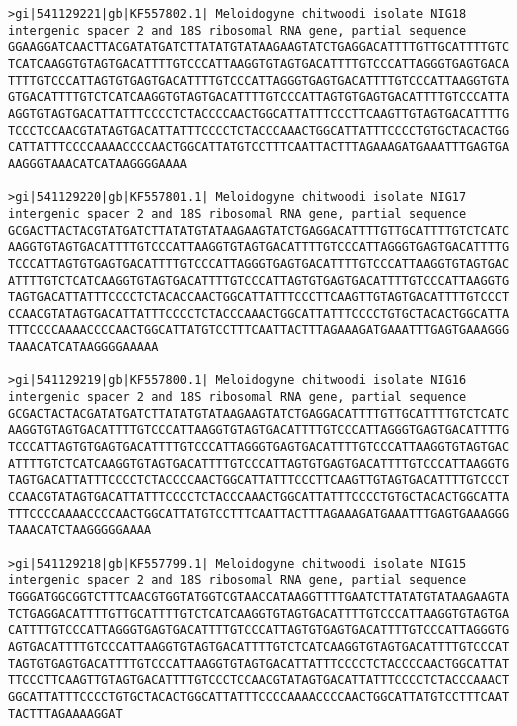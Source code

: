 \documentclass[11pt]{article}
\begin{document}
\begin{Verbatim}[commandchars=\\\{\}]
>gi|541129221|gb|KF557802.1| Meloidogyne chitwoodi isolate NIG18 intergenic spacer 2 and 18S ribosomal RNA gene, partial sequence
GGAAGGATCAACTTACGATATGATCTTATATGTATAAGAAGTATCTGAGGACATTTTGTTGCATTTTGTC
TCATCAAGGTGTAGTGACATTTTGTCCCATTAAGGTGTAGTGACATTTTGTCCCATTAGGGTGAGTGACA
TTTTGTCCCATTAGTGTGAGTGACATTTTGTCCCATTAGGGTGAGTGACATTTTGTCCCATTAAGGTGTA
GTGACATTTTGTCTCATCAAGGTGTAGTGACATTTTGTCCCATTAGTGTGAGTGACATTTTGTCCCATTA
AGGTGTAGTGACATTATTTCCCCTCTACCCCAACTGGCATTATTTCCCTTCAAGTTGTAGTGACATTTTG
TCCCTCCAACGTATAGTGACATTATTTCCCCTCTACCCAAACTGGCATTATTTCCCCTGTGCTACACTGG
CATTATTTCCCCAAAACCCCAACTGGCATTATGTCCTTTCAATTACTTTAGAAAGATGAAATTTGAGTGA
AAGGGTAAACATCATAAGGGGAAAA

>gi|541129220|gb|KF557801.1| Meloidogyne chitwoodi isolate NIG17 intergenic spacer 2 and 18S ribosomal RNA gene, partial sequence
GCGACTTACTACGTATGATCTTATATGTATAAGAAGTATCTGAGGACATTTTGTTGCATTTTGTCTCATC
AAGGTGTAGTGACATTTTGTCCCATTAAGGTGTAGTGACATTTTGTCCCATTAGGGTGAGTGACATTTTG
TCCCATTAGTGTGAGTGACATTTTGTCCCATTAGGGTGAGTGACATTTTGTCCCATTAAGGTGTAGTGAC
ATTTTGTCTCATCAAGGTGTAGTGACATTTTGTCCCATTAGTGTGAGTGACATTTTGTCCCATTAAGGTG
TAGTGACATTATTTCCCCTCTACACCAACTGGCATTATTTCCCTTCAAGTTGTAGTGACATTTTGTCCCT
CCAACGTATAGTGACATTATTTCCCCTCTACCCAAACTGGCATTATTTCCCCTGTGCTACACTGGCATTA
TTTCCCCAAAACCCCAACTGGCATTATGTCCTTTCAATTACTTTAGAAAGATGAAATTTGAGTGAAAGGG
TAAACATCATAAGGGGAAAAA

>gi|541129219|gb|KF557800.1| Meloidogyne chitwoodi isolate NIG16 intergenic spacer 2 and 18S ribosomal RNA gene, partial sequence
GCGACTACTACGATATGATCTTATATGTATAAGAAGTATCTGAGGACATTTTGTTGCATTTTGTCTCATC
AAGGTGTAGTGACATTTTGTCCCATTAAGGTGTAGTGACATTTTGTCCCATTAGGGTGAGTGACATTTTG
TCCCATTAGTGTGAGTGACATTTTGTCCCATTAGGGTGAGTGACATTTTGTCCCATTAAGGTGTAGTGAC
ATTTTGTCTCATCAAGGTGTAGTGACATTTTGTCCCATTAGTGTGAGTGACATTTTGTCCCATTAAGGTG
TAGTGACATTATTTCCCCTCTACCCCAACTGGCATTATTTCCCTTCAAGTTGTAGTGACATTTTGTCCCT
CCAACGTATAGTGACATTATTTCCCCTCTACCCAAACTGGCATTATTTCCCCTGTGCTACACTGGCATTA
TTTCCCCAAAACCCCAACTGGCATTATGTCCTTTCAATTACTTTAGAAAGATGAAATTTGAGTGAAAGGG
TAAACATCTAAGGGGGAAAA

>gi|541129218|gb|KF557799.1| Meloidogyne chitwoodi isolate NIG15 intergenic spacer 2 and 18S ribosomal RNA gene, partial sequence
TGGGATGGCGGTCTTTCAACGTGGTATGGTCGTAACCATAAGGTTTTGAATCTTATATGTATAAGAAGTA
TCTGAGGACATTTTGTTGCATTTTGTCTCATCAAGGTGTAGTGACATTTTGTCCCATTAAGGTGTAGTGA
CATTTTGTCCCATTAGGGTGAGTGACATTTTGTCCCATTAGTGTGAGTGACATTTTGTCCCATTAGGGTG
AGTGACATTTTGTCCCATTAAGGTGTAGTGACATTTTGTCTCATCAAGGTGTAGTGACATTTTGTCCCAT
TAGTGTGAGTGACATTTTGTCCCATTAAGGTGTAGTGACATTATTTCCCCTCTACCCCAACTGGCATTAT
TTCCCTTCAAGTTGTAGTGACATTTTGTCCCTCCAACGTATAGTGACATTATTTCCCCTCTACCCAAACT
GGCATTATTTCCCCTGTGCTACACTGGCATTATTTCCCCAAAACCCCAACTGGCATTATGTCCTTTCAAT
TACTTTAGAAAAGGAT


\end{Verbatim}
\end{document}
